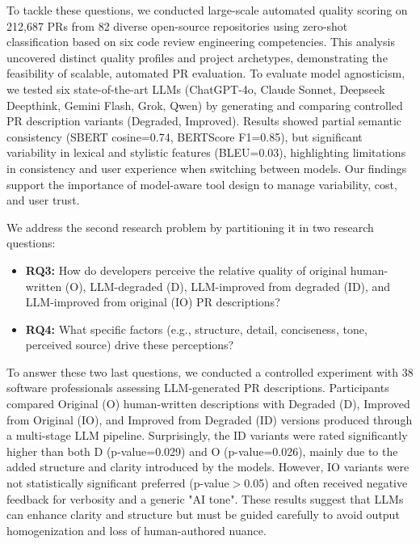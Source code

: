 \documentclass[conference]{IEEEtran}
\begin{document}
To tackle these questions, we conducted large-scale automated quality scoring on 212,687 PRs from 82 diverse open-source repositories using zero-shot classification based on six code review engineering competencies\cite{wurzel2023competencies}. This analysis uncovered distinct quality profiles and project archetypes, demonstrating the feasibility of scalable, automated PR evaluation.
To evaluate model agnosticism, we tested six state-of-the-art LLMs (ChatGPT-4o, Claude Sonnet, Deepseek Deepthink, Gemini Flash, Grok, Qwen) by generating and comparing controlled PR description variants (Degraded, Improved).
Results showed partial semantic consistency (SBERT cosine=0.74, BERTScore F1=0.85), but significant variability in lexical and stylistic features (BLEU=0.03), highlighting limitations in consistency and user experience when switching between models. Our findings support the importance of model-aware tool design to manage variability, cost, and user trust.

We address the second research problem by partitioning it in two research questions:
\begin{itemize}
    \item \textbf{RQ3:} How do developers perceive the relative quality of original human-written (O), LLM-degraded (D), LLM-improved from degraded (ID), and LLM-improved from original (IO) PR descriptions?
    \item \textbf{RQ4:} What specific factors (e.g., structure, detail, conciseness, tone, perceived source) drive these perceptions?
\end{itemize}

To answer these two last questions, we conducted a controlled experiment with 38 software professionals assessing LLM-generated PR descriptions. Participants compared Original (O) human-written descriptions with Degraded (D), Improved from Original (IO), and Improved from Degraded (ID) versions produced through a multi-stage LLM pipeline. Surprisingly, the ID variants were rated significantly higher than both D (p-value=0.029) and O (p-value=0.026), mainly due to the added structure and clarity introduced by the models. However, IO variants were not statistically significant preferred (p-value$>$0.05) and often received negative feedback for verbosity and a generic "AI tone". These results suggest that LLMs can enhance clarity and structure but must be guided carefully to avoid output homogenization and loss of human-authored nuance.
\end{document}
